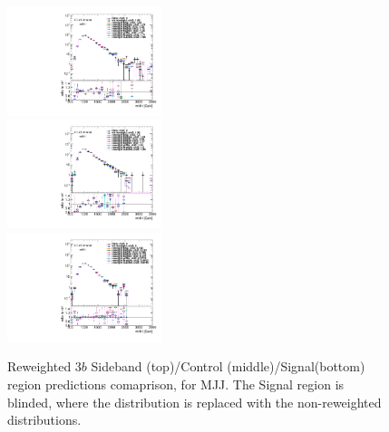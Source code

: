 \begin{figure}[htbp!]
\begin{center}
\includegraphics[width=0.4\textwidth,angle=-90]{figures/boosted/AppendixReweight/Compare/Data_ThreeTag_Sideband_directcompare_mHH_l_1.pdf}\\
\includegraphics[width=0.4\textwidth,angle=-90]{figures/boosted/AppendixReweight/Compare/Data_ThreeTag_Control_directcompare_mHH_l_1.pdf}\\
\includegraphics[width=0.4\textwidth,angle=-90]{figures/boosted/AppendixReweight/Compare/Data_ThreeTag_Signal_directcompare_mHH_l_1.pdf}
\caption{Reweighted 3$b$ Sideband (top)/Control (middle)/Signal(bottom) region predictions comaprison, for MJJ. The Signal region is blinded, where the distribution is replaced with the non-reweighted distributions.}
\label{fig:app-rw-comp-3b}
\end{center}
\end{figure}

